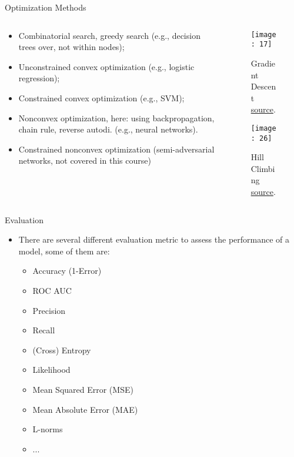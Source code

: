 \documentclass[compress,oilve]{beamer}
\begin{document}
\begin{frame}{Optimization Methods}
\begin{columns}
\begin{column}{0.5\textwidth}
\begin{itemize}
\item Combinatorial search, greedy search (e.g., decision trees over, not within nodes);
\item Unconstrained convex optimization (e.g., logistic regression);
\item Constrained convex optimization (e.g., SVM);
\item Nonconvex optimization, here: using backpropagation, chain rule, reverse autodi. (e.g., neural networks).
\item Constrained nonconvex optimization (semi-adversarial networks, not covered in this course)
\end{itemize}
\end{column}
\begin{column}{0.5\textwidth}
\begin{figure}
\centering
\texttt{[image: 17]}  
 \caption{Gradient Descent \href{https://mpalaourg.me/project/optimization-algorithms}{source}.}
\end{figure}
\begin{figure}
\centering
\texttt{[image: 26]}  
 \caption{Hill Climbing \href{https://www.geeksforgeeks.org/introduction-hill-climbing-artificial-intelligence/}{source}.}
\end{figure}
\end{column}
\end{columns}
\end{frame}

\begin{frame}{Evaluation}
\begin{itemize}
\item There are several different evaluation metric to assess the performance of a
model, some of them are:
	\begin{itemize}
		\item Accuracy (1-Error)
                   \item ROC AUC
                   \item Precision
                   \item Recall
                    \item (Cross) Entropy
                   \item Likelihood
                    \item Mean Squared Error (MSE)
		\item Mean Absolute Error (MAE)
                    \item L-norms
                   \item ...
	\end{itemize}
\end{itemize}
\end{frame}
\end{document}
